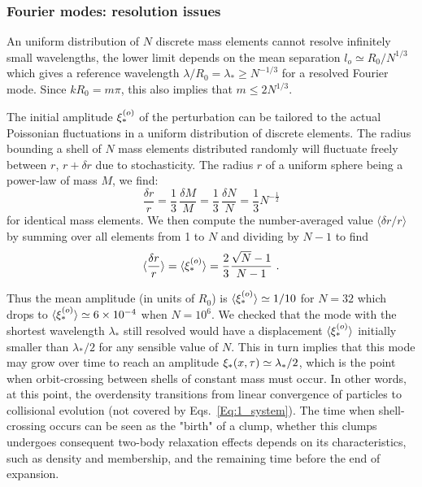 \subsubsection{Fourier modes: resolution issues} 
\label{Ssub:1_FourierModes}
An uniform distribution of $N$ discrete mass elements cannot resolve infinitely small wavelengths, the lower limit depends on the mean separation $l_o\simeq R_0 / N^{1/3}$ which gives a reference wavelength $\lambda / R_0 = \lambda_\ast \ge N^{-1/3}$ for a resolved  Fourier mode. 
Since $kR_0 = m\pi$, this also implies that $ m \le 2 N^{1/3}$.  

The initial amplitude $\xi_\ast^{(o)}$  of the perturbation can be tailored to the actual Poissonian fluctuations in a uniform distribution of discrete elements. The radius bounding a shell of $N$ mass elements distributed randomly will fluctuate freely between $r$, $r + \delta r$ due to stochasticity. The radius $r$ of a uniform sphere being a power-law of mass $M$, we 
find:
\begin{equation}
\frac{\delta r}{r} = \frac{1}{3}\,\frac{\delta M}{M} =  \frac{1}{3}\,\frac{\delta N}{N} = \frac{1}{3} N^{-\frac{1}{2}}
\end{equation}
 for identical mass elements. We then compute the number-averaged value $\langle \delta r/r\rangle$ by summing over  all elements from 1 to $N$ and dividing by $N-1$ to find 
\begin{equation}
\langle \frac{\delta r}{r} \rangle = \langle \xistaro\rangle = \frac{2}{3} \frac{\sqrt{N} - 1 }{N - 1} \ .
\end{equation}  

Thus the mean amplitude (in units of $R_0$) is $\langle\xi_\ast^{(o)}\rangle\simeq 1/10$ for $N=32$ which drops to $\langle\xi_\ast^{(o)}\rangle\simeq 6\times 10^{-4}$ when $N = 10^6$. We checked that the mode with the shortest wavelength $\lambda_\ast$ still resolved would have a displacement $\langle\xi_\ast^{(o)}\rangle$ initially 
smaller than $\lambda_\ast/2$ for any sensible value of $N$. This in turn implies that this mode may grow over time to reach an amplitude $\xi_\ast(x,\tau) \simeq \lambda_\ast/2$, which is the point when orbit-crossing between shells of constant mass must occur. In other words, at this point, the overdensity transitions from linear convergence of particles to  collisional evolution (not covered by Eqs.~\ref{Eq:1_system}). The time when shell-crossing occurs can be seen as the "birth" of a clump, whether this clumps undergoes consequent two-body relaxation effects depends on its characteristics, such as density and membership, and the remaining time before the end of expansion. 


